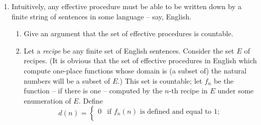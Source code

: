 {\begin{enumerate}
\begin{enumerate}
	\item Let $\Gamma$ be a possibly infinite set of sentences of \lone\ such that $\Gamma \vDash$. Show that there is a finite disjunction, $\delta$, each disjunct of which is the negation of a sentence in $\Gamma$, and such that $\vDash \delta$.
	\item Consider the following relation holding between sets of sentences: \begin{quote} Where $\Gamma$ and $\Delta$ are any sets of sentences,
		$\Gamma \vDash^{\!\star} \Delta$ is correct iff every structure which satisfies \emph{every} $\gamma \in \Gamma$ is also one which satisfies \emph{at least one} $\delta \in \Delta$.
	\end{quote}Show that if $\Gamma \vDash^{\!\star} \Delta$ and neither is empty (though either or both may be infinite), there is a finite conjunction of \lone\ sentences in $\Gamma$, $$\Phi = (\phi_{1}\wedge \ldots \wedge \phi_{m}),$$ and a finite disjunction of \lone\ sentences in $\Delta$, $$\Psi = (\psi_{1} \vee \ldots\vee \psi_{n}),$$ such that $\Phi \vDash \Psi$. (You may assume the Compactness theorem.) 
	\item A set of sentences of English is \emph{compossible} just in case it is possible for them all to be true together. An analogue for the compactness theorem in English would be: for every infinite set $E$ of English sentences not all compossible, there is a finite subset of $E$ whose members are not all compossible. \begin{enumerate}
		\item Show that this analogue of compactness fails for English.
		\item What does this show about translations from English into \lone?
	\end{enumerate}
\end{enumerate}
\item Intuitively, any effective procedure must be able to be written down by a finite string of sentences in some language – say, English. \begin{enumerate}
	\item Give an argument that the set of effective procedures is countable.
	\item Let a \emph{recipe} be any finite set of English sentences.
		Consider the set $E$ of recipes. (It is obvious that the set of effective procedures in English which compute one-place functions whose domain is (a subset of) the natural numbers will be a subset of $E$.)  This set is countable; let $f_{n}$ be the function – if there is one – computed by the $n$-th recipe in $E$ under some enumeration of $E$. Define $$d(n)=\begin{cases}0 &\text{if $f_{n}(n)$ is defined and equal to $1$};\\

\end{cases}$$
\end{enumerate}
\end{enumerate}}
